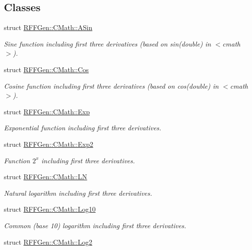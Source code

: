 \subsection*{Classes}
\begin{DoxyCompactItemize}
\item 
struct \hyperlink{structRFFGen_1_1CMath_1_1ASin}{R\-F\-F\-Gen\-::\-C\-Math\-::\-A\-Sin}
\begin{DoxyCompactList}\small\item\em Sine function including first three derivatives (based on sin(double) in $<$cmath$>$). \end{DoxyCompactList}\item 
struct \hyperlink{structRFFGen_1_1CMath_1_1Cos}{R\-F\-F\-Gen\-::\-C\-Math\-::\-Cos}
\begin{DoxyCompactList}\small\item\em Cosine function including first three derivatives (based on cos(double) in $<$cmath$>$). \end{DoxyCompactList}\item 
struct \hyperlink{structRFFGen_1_1CMath_1_1Exp}{R\-F\-F\-Gen\-::\-C\-Math\-::\-Exp}
\begin{DoxyCompactList}\small\item\em Exponential function including first three derivatives. \end{DoxyCompactList}\item 
struct \hyperlink{structRFFGen_1_1CMath_1_1Exp2}{R\-F\-F\-Gen\-::\-C\-Math\-::\-Exp2}
\begin{DoxyCompactList}\small\item\em Function $2^x$ including first three derivatives. \end{DoxyCompactList}\item 
struct \hyperlink{structRFFGen_1_1CMath_1_1LN}{R\-F\-F\-Gen\-::\-C\-Math\-::\-L\-N}
\begin{DoxyCompactList}\small\item\em Natural logarithm including first three derivatives. \end{DoxyCompactList}\item 
struct \hyperlink{structRFFGen_1_1CMath_1_1Log10}{R\-F\-F\-Gen\-::\-C\-Math\-::\-Log10}
\begin{DoxyCompactList}\small\item\em Common (base 10) logarithm including first three derivatives. \end{DoxyCompactList}\item 
struct \hyperlink{structRFFGen_1_1CMath_1_1Log2}{R\-F\-F\-Gen\-::\-C\-Math\-::\-Log2}

\end{DoxyCompactItemize}
